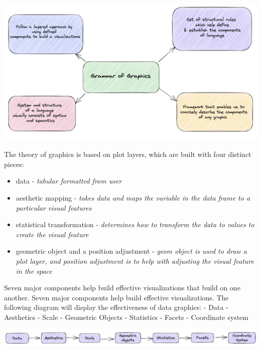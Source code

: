 \documentclass[print]{nuthesis}
\providecommand{\tightlist}{%
  \setlength{\itemsep}{0pt}\setlength{\parskip}{0pt}}
\begin{document}
\begin{center}
\includegraphics[width=\textwidth]{figure/ggDiagram}
\end{center}

The theory of graphics is based on plot layers, which are built with four distinct pieces:

\begin{itemize}
\tightlist
\item
  data - \emph{tabular formatted from user}
\item
  aesthetic mapping - \emph{takes data and maps the variable in the data frame to a particular visual features}
\item
  statistical transformation - \emph{determines how to transform the data to values to create the visual feature}
\item
  geometric object and a position adjustment - \emph{geom object is used to draw a plot layer, and position adjustment is to help with adjusting the visual feature in the space}
\end{itemize}

Seven major components help build effective visualizations that build on one another. Seven major components help build effective visualizations. The following diagram will display the effectiveness of data graphics:
- Data
- Aesthetics
- Scale
- Geometric Objects
- Statistics
- Facets
- Coordinate system

\begin{center}
\includegraphics[width=\textwidth]{figure/EffectiveDataGraphics}
\end{center}
\end{document}
